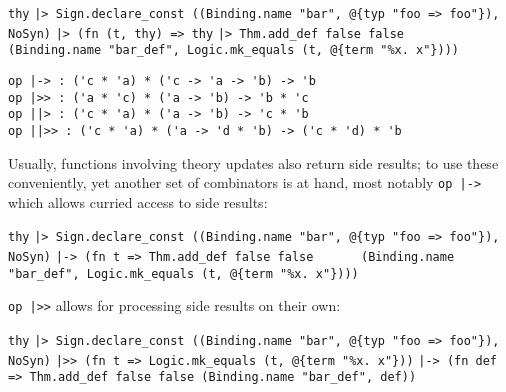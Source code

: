 \begin{isabellebody}
\begin{isamarkuptext}
  \smallskip\begin{mldecls}
\verb|thy|\isasep\isanewline%
\verb||\verb,|,\verb|> Sign.declare_const ((Binding.name "bar", @{typ "foo => foo"}), NoSyn)|\isasep\isanewline%
\verb||\verb,|,\verb|> (fn (t, thy) => thy|\isasep\isanewline%
\verb||\verb,|,\verb|> Thm.add_def false false|\isasep\isanewline%
\verb|     (Binding.name "bar_def", Logic.mk_equals (t, @{term "%x. x"})))|
  \end{mldecls}%
\end{isamarkuptext}%
\isamarkuptrue%
%
\isadelimmlref
%
\endisadelimmlref
%
\isatagmlref
%
\begin{isamarkuptext}%
\begin{mldecls}
  \verb|op |\verb,|,\verb|-> : ('c * 'a) * ('c -> 'a -> 'b) -> 'b| \\
  \verb|op |\verb,|,\verb|>> : ('a * 'c) * ('a -> 'b) -> 'b * 'c| \\
  \verb|op |\verb,|,\verb||\verb,|,\verb|> : ('c * 'a) * ('a -> 'b) -> 'c * 'b| \\
  \verb|op |\verb,|,\verb||\verb,|,\verb|>> : ('c * 'a) * ('a -> 'd * 'b) -> ('c * 'd) * 'b| \\
  \end{mldecls}%
\end{isamarkuptext}%
\isamarkuptrue%
%
\endisatagmlref
{\isafoldmlref}%
%
\isadelimmlref
%
\endisadelimmlref
%
\begin{isamarkuptext}%
\noindent Usually, functions involving theory updates also return
  side results; to use these conveniently, yet another
  set of combinators is at hand, most notably \verb|op |\verb,|,\verb|->|
  which allows curried access to side results:

  \smallskip\begin{mldecls}
\verb|thy|\isasep\isanewline%
\verb||\verb,|,\verb|> Sign.declare_const ((Binding.name "bar", @{typ "foo => foo"}), NoSyn)|\isasep\isanewline%
\verb||\verb,|,\verb|-> (fn t => Thm.add_def false false|\isasep\isanewline%
\verb|      (Binding.name "bar_def", Logic.mk_equals (t, @{term "%x. x"})))|\isasep\isanewline%

  \end{mldecls}

  \noindent \verb|op |\verb,|,\verb|>>| allows for processing side results on their own:

  \smallskip\begin{mldecls}
\verb|thy|\isasep\isanewline%
\verb||\verb,|,\verb|> Sign.declare_const ((Binding.name "bar", @{typ "foo => foo"}), NoSyn)|\isasep\isanewline%
\verb||\verb,|,\verb|>> (fn t => Logic.mk_equals (t, @{term "%x. x"}))|\isasep\isanewline%
\verb||\verb,|,\verb|-> (fn def => Thm.add_def false false (Binding.name "bar_def", def))|\isasep\isanewline%


\end{mldecls}
\end{isamarkuptext}
\end{isabellebody}
